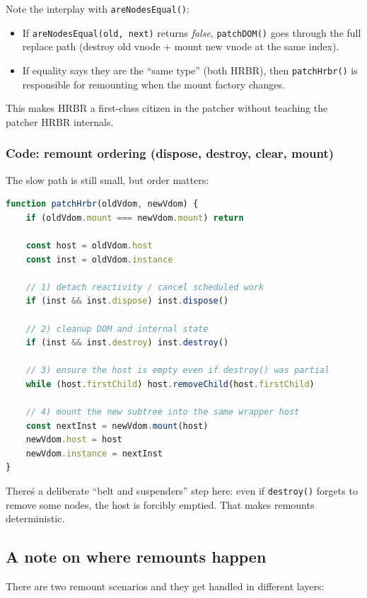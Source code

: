 Note the interplay with \texttt{areNodesEqual()}:

\begin{itemize}
\item If \texttt{areNodesEqual(old, next)} returns \emph{false}, \texttt{patchDOM()} goes through the full replace path (destroy old vnode + mount new vnode at the same index).
\item If equality says they are the ``same type'' (both HRBR), then \texttt{patchHrbr()} is responsible for remounting when the mount factory changes.
\end{itemize}

This makes HRBR a first-class citizen in the patcher without teaching the patcher HRBR internals.

\subsubsection*{Code: remount ordering (dispose, destroy, clear, mount)}

The slow path is still small, but order matters:

\begin{lstlisting}[language=JavaScript]
function patchHrbr(oldVdom, newVdom) {
	if (oldVdom.mount === newVdom.mount) return

	const host = oldVdom.host
	const inst = oldVdom.instance

	// 1) detach reactivity / cancel scheduled work
	if (inst && inst.dispose) inst.dispose()

	// 2) cleanup DOM and internal state
	if (inst && inst.destroy) inst.destroy()

	// 3) ensure the host is empty even if destroy() was partial
	while (host.firstChild) host.removeChild(host.firstChild)

	// 4) mount the new subtree into the same wrapper host
	const nextInst = newVdom.mount(host)
	newVdom.host = host
	newVdom.instance = nextInst
}
\end{lstlisting}

There\'s a deliberate ``belt and suspenders'' step here: even if \texttt{destroy()} forgets to remove some nodes, the host is forcibly emptied.
That makes remounts deterministic.

\subsection{A note on where remounts happen}

There are two remount scenarios and they get handled in different layers:

